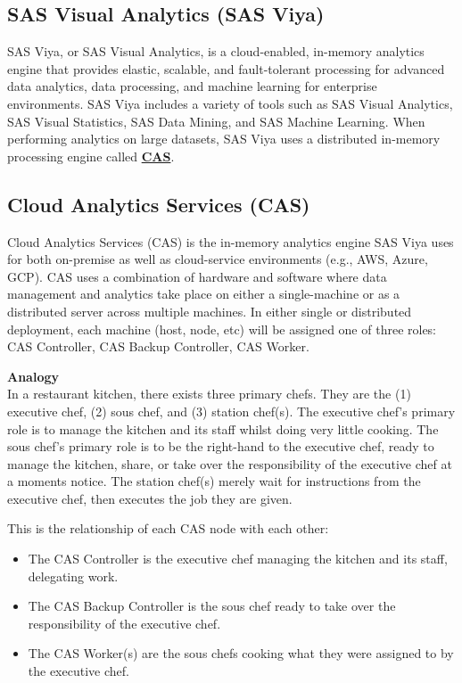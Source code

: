 \subsection{SAS Visual Analytics (SAS Viya)}
SAS Viya, or SAS Visual Analytics, is a cloud-enabled, in-memory analytics engine that provides elastic, scalable, and fault-tolerant processing for advanced data analytics, data processing, and machine learning for enterprise environments. SAS Viya includes a variety of tools such as SAS Visual Analytics, SAS Visual Statistics, SAS Data Mining, and SAS Machine Learning. When performing analytics on large datasets, SAS Viya uses a distributed in-memory processing engine called \href{https://documentation.sas.com/doc/en/calcdc/3.3/calserverscas/n05000viyaservers000000admin.htm}{\textbf{CAS}}.

\subsection{Cloud Analytics Services (CAS)}
Cloud Analytics Services (CAS) is the in-memory analytics engine SAS Viya uses for both on-premise as well as cloud-service environments (e.g., AWS, Azure, GCP). CAS uses a combination of hardware and software where data management and analytics take place on either a single-machine or as a distributed server across multiple machines. In either single or distributed deployment, each machine (host, node, etc) will be assigned one of three roles: CAS Controller, CAS Backup Controller, CAS Worker.

\textbf{Analogy}
\\
In a restaurant kitchen, there exists three primary chefs. They are the (1) executive chef, (2) sous chef, and (3) station chef(s). The executive chef's primary role is to manage the kitchen and its staff whilst doing very little cooking. The sous chef's primary role is to be the right-hand to the executive chef, ready to manage the kitchen, share, or take over the responsibility of the executive chef at a moments notice. The station chef(s) merely wait for instructions from the executive chef, then executes the job they are given. 

This is the relationship of each CAS node with each other:
\begin{itemize}
    \item The CAS Controller is the executive chef managing the kitchen and its staff, delegating work.
    \item The CAS Backup Controller is the sous chef ready to take over the responsibility of the executive chef. 
    \item The CAS Worker(s) are the sous chefs cooking what they were assigned to by the executive chef. 
\end{itemize}

